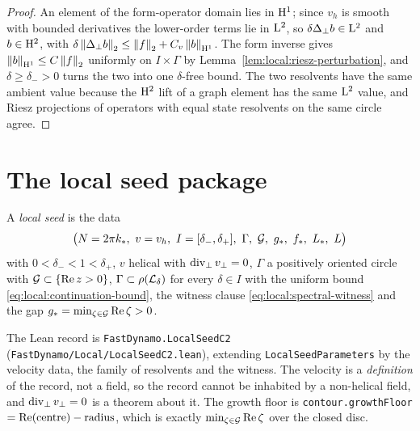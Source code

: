 \begin{proof}
  \leanok
  An element of the form-operator domain lies in $\mathrm{H}^1$; since $v_h$ is smooth with
  bounded derivatives the lower-order terms lie in $\mathrm{L}^2$, so
  $\delta\Delta_\perp b\in\mathrm{L}^2$ and $b\in\mathrm{H}^2$, with
  $\delta\left\|\Delta_\perp b\right\|_2\leq\left\|f\right\|_2+C_v\left\|b\right\|_{\mathrm{H}^1}$.  The form inverse gives
  $\left\|b\right\|_{\mathrm{H}^1}\leq C\left\|f\right\|_2$ uniformly on $I\times\Gamma$ by
  Lemma~\ref{lem:local:riesz-perturbation}, and $\delta\geq\delta_->0$ turns the two into
  one $\delta$-free bound.  The two resolvents have the same ambient value because the
  $\mathrm{H}^2$ lift of a graph element has the same $\mathrm{L}^2$ value, and Riesz projections of
  operators with equal state resolvents on the same circle agree.
\end{proof}

\section{The local seed package}

\begin{definition}
  \label{def:local:seed}
  \leanok
  A \emph{local seed} is the data
  \[
    \bigl(N=2\pi k_*,\ v=v_h,\ I=[\delta_-,\delta_+],\ \Gamma,\ \cG,\ g_*,\ f_*,\ L_*,\ L\bigr)
  \]
  with $0<\delta_-<1<\delta_+$, $v$ helical with $\operatorname{div}_\perp v_\perp=0$, $\Gamma$ a
  positively oriented circle with $\mathcal{G}\subset\{\operatorname{Re} z>0\}$,
  $\Gamma\subset\rho(\mathcal{L}_\delta)$ for every $\delta\in I$ with the uniform bound
  \eqref{eq:local:continuation-bound}, the witness clause
  \eqref{eq:local:spectral-witness} and the gap
  $g_*=\min_{\zeta\in\mathcal{G}}\operatorname{Re}\zeta>0$.
\end{definition}

The Lean record is \texttt{FastDynamo.LocalSeedC2}
(\texttt{FastDynamo/Local/LocalSeedC2.lean}), extending
\texttt{LocalSeedParameters} by the velocity data, the family of resolvents and the
witness.  The velocity is a \emph{definition} of the record, not a field, so the record
cannot be inhabited by a non-helical field, and $\operatorname{div}_\perp v_\perp=0$ is a theorem about
it.  The growth floor is \texttt{contour.growthFloor}$=\operatorname{Re}(\text{centre})-\text{radius}$,
which is exactly $\min_{\zeta\in\mathcal{G}}\operatorname{Re}\zeta$ over the closed disc.


